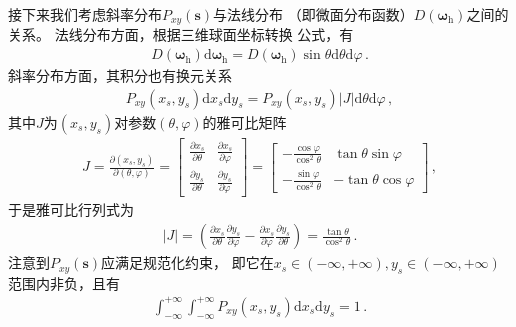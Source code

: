 接下来我们考虑斜率分布$P_{xy}({\bm s})$与法线分布
（即微面分布函数）$D({\bm\omega}_{\mathrm{h}})$之间的关系。
法线分布方面，根据三维球面坐标转换
公式，有
\begin{align}\label{eq:08-ex01-D_sphere}
    D({\bm\omega}_{\mathrm{h}})\mathrm{d}{\bm\omega}_{\mathrm{h}}
    =D({\bm\omega}_{\mathrm{h}})\sin\theta\mathrm{d}\theta\mathrm{d}\varphi\, .
\end{align}
斜率分布方面，其积分也有换元关系
\begin{align}\label{eq:08-ex01-Pxy-Jacobian}
    P_{xy}(x_s,y_s)\mathrm{d}x_s\mathrm{d}y_s
    =P_{xy}(x_s,y_s)|J|\mathrm{d}\theta\mathrm{d}\varphi\, ,
\end{align}
其中$J$为$(x_s,y_s)$对参数$(\theta,\varphi)$的雅可比矩阵
\begin{align}
    J=\displaystyle\frac{\partial(x_s,y_s)}{\partial(\theta,\varphi)}
    =\displaystyle\left[\begin{array}{cc}
            \displaystyle\frac{\partial x_s}{\partial \theta} &
            \displaystyle\frac{\partial x_s}{\partial \varphi}  \\
            \displaystyle\frac{\partial y_s}{\partial \theta} &
            \displaystyle\frac{\partial y_s}{\partial \varphi}
        \end{array}\right]
    =\displaystyle\left[\begin{array}{rr}
            \displaystyle -\frac{\cos\varphi}{\cos^2\theta} &
            \displaystyle \tan\theta\sin\varphi               \\
            \displaystyle -\frac{\sin\varphi}{\cos^2\theta} &
            \displaystyle -\tan\theta\cos\varphi
        \end{array}\right]\, ,
\end{align}
于是雅可比行列式为
\begin{align}\label{eq:08-ex01-Jacobian-slope-normals}
    |J|=\left(\frac{\partial x_s}{\partial \theta}\frac{\partial y_s}{\partial \varphi}
    -\frac{\partial x_s}{\partial \varphi}\frac{\partial y_s}{\partial \theta}\right)
    =\frac{\tan\theta}{\cos^2\theta}\, .
\end{align}
注意到$P_{xy}({\bm s})$应满足规范化约束，
即它在$x_s\in(-\infty,+\infty),y_s\in(-\infty,+\infty)$范围内非负，且有
\begin{align}\label{eq:08-ex01-normal-of-P2D}
    \int_{-\infty}^{+\infty}\int_{-\infty}^{+\infty}
    P_{xy}(x_s,y_s)\mathrm{d}x_s\mathrm{d}y_s=1\, .
\end{align}
